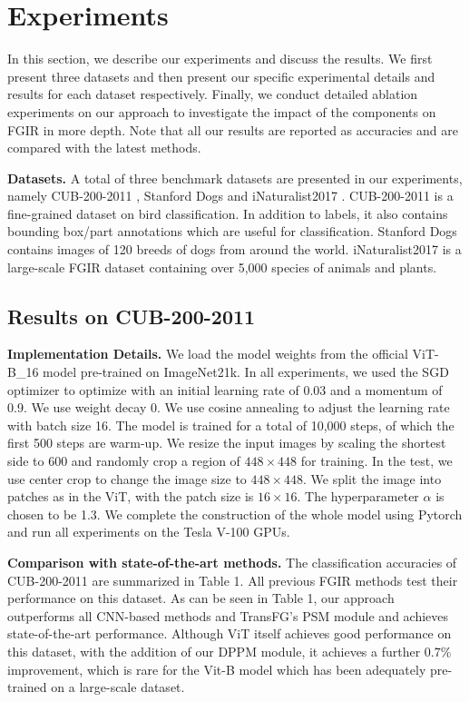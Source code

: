 \documentclass[sigconf]{acmart}
\begin{document}
\section{Experiments}
In this section, we describe our experiments and discuss the results. We first present three datasets and then present our specific experimental details and results for each dataset respectively. Finally, we conduct detailed ablation experiments on our approach to investigate the impact of the components on FGIR in more depth. Note that all our results are reported as accuracies and are compared with the latest methods.

\textbf{Datasets.} A total of three benchmark datasets are presented in our experiments, namely CUB-200-2011 \cite{CUB}, Stanford Dogs \cite{Stanford_dogs} and iNaturalist2017 \cite{iNat}. CUB-200-2011 is a fine-grained dataset on bird classification. In addition to labels, it also contains bounding box/part annotations which are useful for classification. Stanford Dogs contains images of 120 breeds of dogs from around the world. iNaturalist2017 is a large-scale FGIR dataset containing over 5,000 species of animals and plants.

\subsection{Results on CUB-200-2011}


\textbf{Implementation Details.} We load the model weights from the official ViT-B\_16 model pre-trained on ImageNet21k. In all experiments, we used the SGD optimizer to optimize with an initial learning rate of 0.03 and a momentum of 0.9. We use weight decay 0.  We use cosine annealing to adjust the learning rate with batch size 16. The model is trained for a total of 10,000 steps, of which the first 500 steps are warm-up. We resize the input images by scaling the shortest side to 600 and randomly crop a region of $448 \times 448$ for training. In the test, we use center crop to change the image size to $448 \times 448$. We split the image into patches as in the ViT, with the patch size is $16 \times16$. The hyperparameter $\alpha$ is chosen to be 1.3. We complete the construction of the whole model using Pytorch and run all experiments on the Tesla V-100 GPUs.

\textbf{Comparison with state-of-the-art methods.} The classification accuracies of CUB-200-2011 are summarized in Table 1. All previous FGIR methods test their performance on this dataset. As can be seen in Table 1, our approach outperforms all CNN-based methods and TransFG's PSM module and achieves state-of-the-art performance. Although ViT itself achieves good performance on this dataset, with the addition of our DPPM module, it achieves a further 0.7\% improvement, which is rare for the Vit-B model which has been adequately pre-trained on a large-scale dataset.
\end{document}
